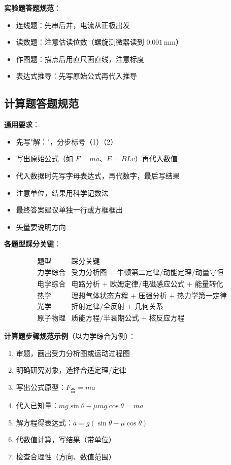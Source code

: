 \textbf{实验题答题规范}：
\begin{itemize}
  \item 连线题：先串后并，电流从正极出发
  \item 读数题：注意估读位数（螺旋测微器读到 $0.001\,\text{mm}$）
  \item 作图题：描点后用直尺画直线，注意标度
  \item 表达式推导：先写原始公式再代入推导
\end{itemize}

\subsection{计算题答题规范}

\textbf{通用要求}：
\begin{itemize}
  \item 先写"解："，分步标号（1）（2）
  \item 写出原始公式（如 $F=ma$、$E=BLv$）再代入数值
  \item 代入数据时先写字母表达式，再代数字，最后写结果
  \item 注意单位，结果用科学记数法
  \item 最终答案建议单独一行或方框框出
  \item 矢量要说明方向
\end{itemize}

\textbf{各题型踩分关键}：

\[
\begin{array}{c|c}
\text{题型} & \text{踩分关键} \\ \hline
\text{力学综合} & \text{受力分析图 + 牛顿第二定律/动能定理/动量守恒}\\
\text{电学综合} & \text{电路分析 + 欧姆定律/电磁感应公式 + 能量转化}\\
\text{热学} & \text{理想气体状态方程 + 压强分析 + 热力学第一定律}\\
\text{光学} & \text{折射定律/全反射 + 几何关系}\\
\text{原子物理} & \text{质能方程/半衰期公式 + 核反应方程}
\end{array}
\]

\textbf{计算题步骤规范示例}（以力学综合为例）：

\begin{enumerate}
  \item 审题，画出受力分析图或运动过程图
  \item 明确研究对象，选择合适定理/定律
  \item 写出公式原型：$F_{\text{合}} = ma$
  \item 代入已知量：$mg\sin\theta - \mu mg\cos\theta = ma$
  \item 解方程得表达式：$a = g(\sin\theta - \mu\cos\theta)$
  \item 代数值计算，写结果（带单位）
  \item 检查合理性（方向、数值范围）
\end{enumerate}

